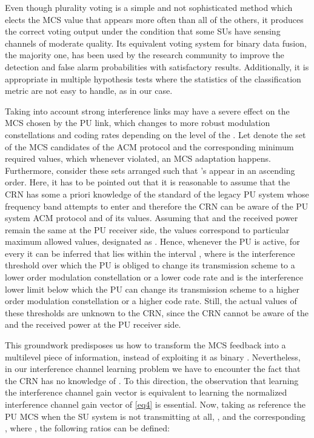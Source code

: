 \documentclass[journal]{IEEEtran}
\begin{document}
Even though plurality voting is a simple and not sophisticated method which elects the MCS
value that appears more often than all of the others, it produces the correct voting output under the condition that some SUs have sensing channels of moderate quality. Its equivalent voting system for binary data fusion, the majority one, has been used by the research community to improve the detection and false alarm probabilities with satisfactory results. Additionally, it is appropriate in multiple hypothesis tests where the statistics of the classification metric are not easy to handle, as in our case.

Taking into account strong interference links may have a severe effect on the MCS chosen by the PU link, which changes to more robust modulation constellations and coding rates depending on the level of the . Let  denote the set of the MCS candidates of the ACM protocol and  the corresponding minimum required  values, which whenever violated, an MCS adaptation happens. Furthermore, consider these sets arranged such that 's appear in an ascending order. Here, it has to be pointed out that it is reasonable to assume that the CRN has some a priori knowledge of the standard of the legacy PU system whose frequency band attempts to enter and therefore the CRN can be aware of the PU system ACM protocol and of its  values. Assuming that  and the received power remain the same at the PU receiver side, the  values correspond to particular maximum allowed  values, designated as . Hence, whenever the PU is active, for every  it can be inferred that  lies within the interval , where  is the interference threshold over which the PU is obliged to change its transmission scheme to a lower order modulation constellation or a lower code rate and  is the interference lower limit below which the PU can change its transmission scheme to a higher order modulation constellation or a higher code rate. Still, the actual values of these thresholds are unknown to the CRN, since the CRN cannot be aware of the  and the received power at the PU receiver side.

This groundwork predisposes us how to transform the MCS feedback into a multilevel piece of information, instead of exploiting it as binary \cite{biban80}. Nevertheless, in our interference channel learning problem we have to encounter the fact that the CRN has no knowledge of . To this direction, the observation that learning the interference channel gain vector  is equivalent to learning the normalized interference channel gain vector  of \eqref{eq4} is essential. Now, taking as reference the PU MCS when the SU system is not transmitting at all, , and the corresponding , where , the following  ratios can be defined:
\end{document}
